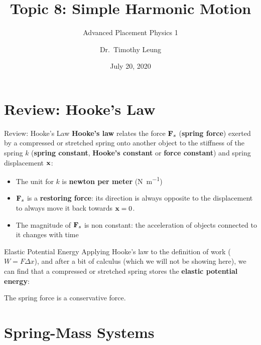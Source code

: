 \documentclass[12pt,compress,aspectratio=169]{beamer}
\title{Topic 8: Simple Harmonic Motion}
\subtitle{Advanced Placement Physics 1}
\author[TML]{Dr.\ Timothy Leung}
\institute{Olympiads School\\Toronto, ON, Canada}
\date{July 20, 2020}
\newcommand{\mb}[1]{\ensuremath\mathbf{#1}}
\newcommand{\eq}[2]{\vspace{#1}{\Large\begin{displaymath}#2\end{displaymath}}}
\begin{document}
\begin{frame}
  \maketitle
\end{frame}


\section{Review: Hooke's Law}

\begin{frame}{Review: Hooke's Law}
  \textbf{Hooke's law} relates the force $\mb{F}_s$ (\textbf{spring force})
  exerted by a compressed or stretched spring onto another object to the
  stiffness of the spring $k$ (\textbf{spring constant}, \textbf{Hooke's
    constant} or \textbf{force constant}) and spring displacement $\mb{x}$:

  \eq{-.1in}{
    \boxed{\mb{F}_s=-k\mb{x}}
  }

  \begin{itemize}
  \item\vspace{-.1in}The unit for $k$ is \textbf{newton per meter}
    (\si{\newton\per\metre})
  \item $\mb{F}_s$ is a \textbf{restoring force}: its direction is always
    opposite to the displacement to always move it back towards $\mb{x}=0$.
  \item The magnitude of $\mb{F}_s$ is non constant: the acceleration of
    objects connected to it changes with time
  \end{itemize}
\end{frame}



\begin{frame}{Elastic Potential Energy}
  Applying Hooke's law to the  definition of work ($W=F\Delta x$), and after a
  bit of calculus (which we will not be showing here), we can find that a
  compressed or stretched spring stores the \textbf{elastic potential energy}:
  
  \eq{-.1in}{
    \boxed{U_e=\frac12kx^2}
  }

  The spring force is a conservative force.
\end{frame}



\section{Spring-Mass Systems}
\end{document}
